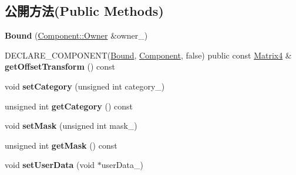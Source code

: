 \subsection*{公開方法(Public Methods)}
\begin{DoxyCompactItemize}
\item 
{\bfseries Bound} (\hyperlink{class_magnum_1_1_component_1_1_owner}{Component\+::\+Owner} \&owner\+\_\+)\hypertarget{class_magnum_1_1_selection3_1_1_bound_a6911f74c665cc70ebc778c96e0284c15}{}\label{class_magnum_1_1_selection3_1_1_bound_a6911f74c665cc70ebc778c96e0284c15}

\item 
D\+E\+C\+L\+A\+R\+E\+\_\+\+C\+O\+M\+P\+O\+N\+E\+NT(\hyperlink{class_magnum_1_1_selection3_1_1_bound}{Bound}, \hyperlink{class_magnum_1_1_component}{Component}, false) public const \hyperlink{class_magnum_1_1_matrix4}{Matrix4} \& {\bfseries get\+Offset\+Transform} () const \hypertarget{class_magnum_1_1_selection3_1_1_bound_a20be04c31cb50351da9bb71ebd13e9d9}{}\label{class_magnum_1_1_selection3_1_1_bound_a20be04c31cb50351da9bb71ebd13e9d9}

\item 
void {\bfseries set\+Category} (unsigned int category\+\_\+)\hypertarget{class_magnum_1_1_selection3_1_1_bound_ab939907c38692c0170938cb6198690db}{}\label{class_magnum_1_1_selection3_1_1_bound_ab939907c38692c0170938cb6198690db}

\item 
unsigned int {\bfseries get\+Category} () const \hypertarget{class_magnum_1_1_selection3_1_1_bound_afb37fa2f507542dff33336bedb46179a}{}\label{class_magnum_1_1_selection3_1_1_bound_afb37fa2f507542dff33336bedb46179a}

\item 
void {\bfseries set\+Mask} (unsigned int mask\+\_\+)\hypertarget{class_magnum_1_1_selection3_1_1_bound_a89bf3e622354f3539ae4cd0d2dc83df1}{}\label{class_magnum_1_1_selection3_1_1_bound_a89bf3e622354f3539ae4cd0d2dc83df1}

\item 
unsigned int {\bfseries get\+Mask} () const \hypertarget{class_magnum_1_1_selection3_1_1_bound_ab9ff6c3591ca3dab7008566a91f263e5}{}\label{class_magnum_1_1_selection3_1_1_bound_ab9ff6c3591ca3dab7008566a91f263e5}

\item 
void {\bfseries set\+User\+Data} (void $\ast$user\+Data\+\_\+)\hypertarget{class_magnum_1_1_selection3_1_1_bound_a42d49328676a3c194e0211ea62e4a164}{}\label{class_magnum_1_1_selection3_1_1_bound_a42d49328676a3c194e0211ea62e4a164}


\end{DoxyCompactItemize}
